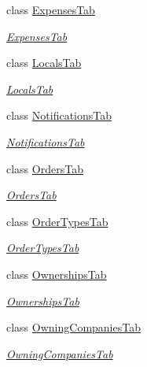 \begin{DoxyCompactItemize}
class \hyperlink{class_baudi_1_1_client_1_1_view_1_1_tabs_1_1_expenses_tab}{Expenses\+Tab}
\begin{DoxyCompactList}\small\item\em \hyperlink{class_baudi_1_1_client_1_1_view_1_1_tabs_1_1_expenses_tab}{Expenses\+Tab} \end{DoxyCompactList}\item 
class \hyperlink{class_baudi_1_1_client_1_1_view_1_1_tabs_1_1_locals_tab}{Locals\+Tab}
\begin{DoxyCompactList}\small\item\em \hyperlink{class_baudi_1_1_client_1_1_view_1_1_tabs_1_1_locals_tab}{Locals\+Tab} \end{DoxyCompactList}\item 
class \hyperlink{class_baudi_1_1_client_1_1_view_1_1_tabs_1_1_notifications_tab}{Notifications\+Tab}
\begin{DoxyCompactList}\small\item\em \hyperlink{class_baudi_1_1_client_1_1_view_1_1_tabs_1_1_notifications_tab}{Notifications\+Tab} \end{DoxyCompactList}\item 
class \hyperlink{class_baudi_1_1_client_1_1_view_1_1_tabs_1_1_orders_tab}{Orders\+Tab}
\begin{DoxyCompactList}\small\item\em \hyperlink{class_baudi_1_1_client_1_1_view_1_1_tabs_1_1_orders_tab}{Orders\+Tab} \end{DoxyCompactList}\item 
class \hyperlink{class_baudi_1_1_client_1_1_view_1_1_tabs_1_1_order_types_tab}{Order\+Types\+Tab}
\begin{DoxyCompactList}\small\item\em \hyperlink{class_baudi_1_1_client_1_1_view_1_1_tabs_1_1_order_types_tab}{Order\+Types\+Tab} \end{DoxyCompactList}\item 
class \hyperlink{class_baudi_1_1_client_1_1_view_1_1_tabs_1_1_ownerships_tab}{Ownerships\+Tab}
\begin{DoxyCompactList}\small\item\em \hyperlink{class_baudi_1_1_client_1_1_view_1_1_tabs_1_1_ownerships_tab}{Ownerships\+Tab} \end{DoxyCompactList}\item 
class \hyperlink{class_baudi_1_1_client_1_1_view_1_1_tabs_1_1_owning_companies_tab}{Owning\+Companies\+Tab}
\begin{DoxyCompactList}\small\item\em \hyperlink{class_baudi_1_1_client_1_1_view_1_1_tabs_1_1_owning_companies_tab}{Owning\+Companies\+Tab} \end{DoxyCompactList}\item 

\end{DoxyCompactItemize}

